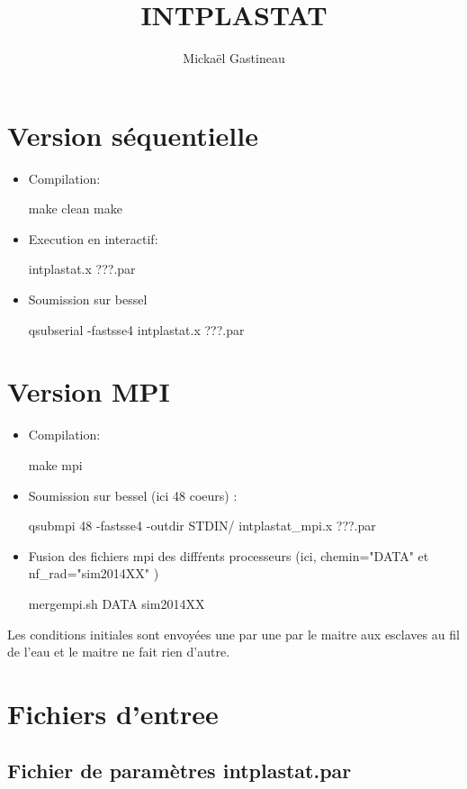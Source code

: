 \documentclass[11pt]{article}
\title{INTPLASTAT}
\author{Micka\"el Gastineau}
\begin{document}
\maketitle

\section{Version s\'equentielle}

\begin{itemize}
 \item Compilation:  
 
make clean
make
 
\item Execution en interactif: 

intplastat.x  ???.par
\item Soumission sur bessel

qsubserial -fastsse4 intplastat.x  ???.par
\end{itemize}

\section{Version MPI}

\begin{itemize}
 \item Compilation:  
 
 make mpi
 
\item Soumission sur bessel (ici 48 coeurs) : 

qsubmpi 48 -fastsse4 -outdir STDIN/ intplastat\_mpi.x  ???.par


\item Fusion des fichiers mpi des diff\'rents processeurs (ici, chemin="DATA" et nf\_rad="sim2014XX" )

mergempi.sh DATA sim2014XX

\end{itemize}

Les conditions initiales sont envoy\'ees une par une par le maitre aux esclaves au fil de l'eau et le maitre ne fait rien d'autre.


\section{Fichiers d'entree}

\subsection{Fichier de param\`etres  intplastat.par}
\end{document}
